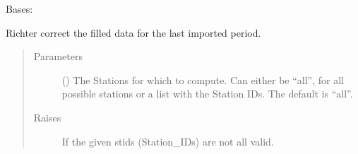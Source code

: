 \documentclass[letterpaper,10pt,english]{sphinxmanual}
\begin{document}
\begin{fulllineitems}
\label{\detokenize{weatherDB:weatherDB.stations.PrecipitationStations}}
\sphinxAtStartPar
Bases: {\hyperref[\detokenize{weatherDB:weatherDB.stations.StationsBase}]{}}

\begin{fulllineitems}
\label{\detokenize{weatherDB:weatherDB.stations.PrecipitationStations.last_imp_corr}}
\sphinxAtStartPar
Richter correct the filled data for the last imported period.
\begin{quote}\begin{description}
\item[{Parameters}] \leavevmode
\sphinxAtStartPar
{} (\sphinxstyleliteralemphasis{\sphinxupquote{, }}) \textendash{} The Stations for which to compute.
Can either be “all”, for all possible stations
or a list with the Station IDs.
The default is “all”.

\item[{Raises}] \leavevmode
\sphinxAtStartPar
{} \textendash{} If the given stids (Station\_IDs) are not all valid.

\end{description}\end{quote}

\end{fulllineitems}



\end{fulllineitems}
\end{document}
